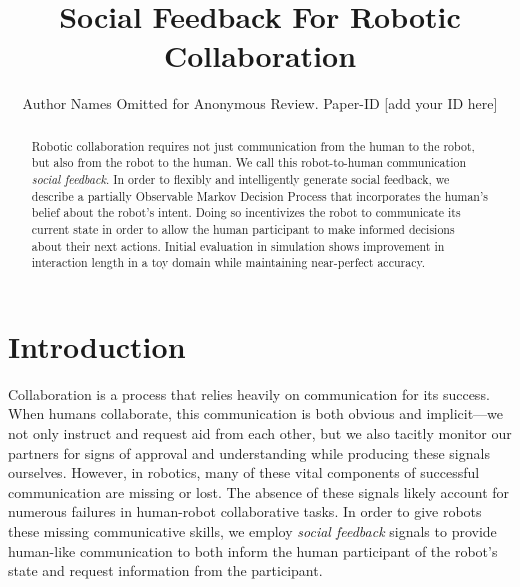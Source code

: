 \documentclass[conference]{IEEEtran}
\begin{document}
\title{Social Feedback For Robotic Collaboration}
\author{Author Names Omitted for Anonymous Review. Paper-ID [add your ID here]}

\maketitle





\begin{abstract}
Robotic collaboration requires not just communication from the human to the robot, but also from the robot to the human. We call this robot-to-human communication \emph{social feedback}. In order to flexibly and intelligently generate social feedback, we describe a partially Observable Markov Decision Process that incorporates the human's belief about the robot's intent. Doing so incentivizes the robot to communicate its current state in order to allow the human participant to make informed decisions about their next actions. Initial evaluation in simulation shows improvement in interaction length in a toy domain while maintaining near-perfect accuracy. 
\end{abstract}

	
\section{Introduction}

Collaboration is a process that relies heavily on communication for its success. When humans collaborate, this communication is both obvious and implicit---we not only instruct and request aid from each other, but we also tacitly monitor our partners for signs of approval and understanding while producing these signals ourselves. However, in robotics, many of these vital components of successful communication are missing or lost. The absence of these signals likely account for numerous failures in human-robot collaborative tasks. In order to give robots these missing communicative skills, we employ \emph{social feedback} signals to provide human-like communication to both inform the human participant of the robot's state and request information from the participant. 
\end{document}
